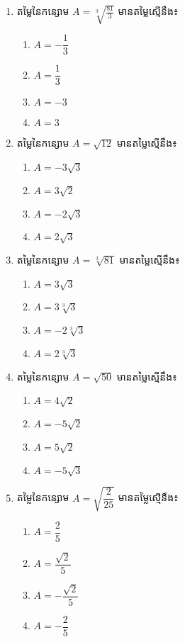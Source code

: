 \begin{enumerate}
\item តម្លៃនៃកន្សោម $A=\sqrt[3]{\frac{81}{3}}$ មានតម្លៃស្មើនឹង៖
\begin{multicols}{4}
\begin{enumerate}[label=\alph*.]
	\item $A=-\dfrac{1}{3}$
	\item $A=\dfrac{1}{3}$
	\item $A=-3$
	\item $A=3$
\end{enumerate}
\end{multicols}

\item តម្លៃនៃកន្សោម $A=\sqrt{12}$ មានតម្លៃស្មើនឹង៖
\begin{multicols}{4}
\begin{enumerate}[label=\alph*.]
	\item $A=-3\sqrt{3}$
	\item $A=3\sqrt{2}$
	\item $A=-2\sqrt{3}$
	\item $A=2\sqrt{3}$
\end{enumerate}
\end{multicols}

\item តម្លៃនៃកន្សោម $A=\sqrt[3]{81}$ មានតម្លៃស្មើនឹង៖
\begin{multicols}{4}
\begin{enumerate}[label=\alph*.]
	\item $A=3\sqrt{3}$
	\item $A=3\sqrt[3]{3}$
	\item $A=-2\sqrt[3]{3}$
	\item $A=2\sqrt[3]{3}$
\end{enumerate}
\end{multicols}

\item តម្លៃនៃកន្សោម $A=\sqrt{50}$ មានតម្លៃស្មើនឹង៖
\begin{multicols}{4}
\begin{enumerate}[label=\alph*.]
	\item $A=4\sqrt{2}$
	\item $A=-5\sqrt{2}$
	\item $A=5\sqrt{2}$
	\item $A=-5\sqrt{3}$
\end{enumerate}
\end{multicols}

\item តម្លៃនៃកន្សោម $A=\sqrt{\dfrac{2}{25}}$ មានតម្លៃស្មើនឹង៖
\begin{multicols}{4}
\begin{enumerate}[label=\alph*.]
	\item $A=\dfrac{2}{5}$
	\item $A=\dfrac{\sqrt{2}}{5}$
	\item $A=-\dfrac{\sqrt{2}}{5}$
	\item $A=-\dfrac{2}{5}$
\end{enumerate}
\end{multicols}


\end{enumerate}
